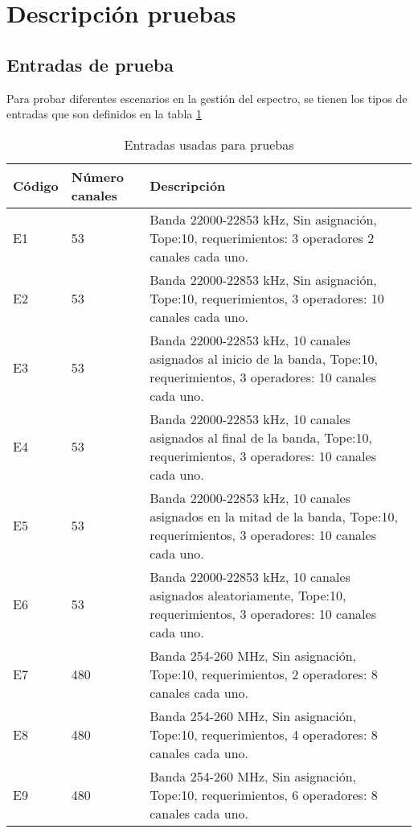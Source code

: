 \section{Descripción pruebas}

\subsection{Entradas de prueba}

Para probar diferentes escenarios en la gestión del espectro, se tienen los tipos de entradas que son definidos en la tabla \ref{tabla:parametrosPruebas}

\begin{center}
\begin{longtable}{|p{2cm}|p{2cm}|p{12.5cm}|}
	\caption{Entradas usadas para pruebas} \label{tabla:parametrosPruebas}\\
	\hline
	\cellcolor[gray]{0.9} \textbf{Código} & \cellcolor[gray]{0.9}\textbf{Número canales} & \cellcolor[gray]{0.9}\textbf{Descripción} \\
	\hline
	E1 & 53 & Banda 22000-22853 kHz, Sin asignación, Tope:10, requerimientos: 3 operadores 2 canales cada uno.\\
	\hline
	E2 & 53 &Banda 22000-22853 kHz,  Sin asignación, Tope:10, requerimientos, 3 operadores: 10 canales cada uno. \\
	\hline
	E3 & 53 &Banda 22000-22853 kHz,  10 canales asignados al inicio de la banda, Tope:10, requerimientos, 3 operadores: 10 canales cada uno. \\
	\hline
	E4 & 53 &Banda 22000-22853 kHz,  10 canales asignados al final de la banda, Tope:10, requerimientos, 3 operadores: 10 canales cada uno. \\
	\hline
	E5 & 53 &Banda 22000-22853 kHz,  10 canales asignados en la mitad de la banda, Tope:10, requerimientos, 3 operadores: 10 canales cada uno. \\
	\hline
	E6 & 53 &Banda 22000-22853 kHz,  10 canales asignados aleatoriamente, Tope:10, requerimientos, 3 operadores: 10 canales cada uno. \\
	\hline
	E7 & 480 &Banda 254-260 MHz,  Sin asignación, Tope:10, requerimientos, 2 operadores: 8 canales cada uno. \\
	\hline
	E8 & 480 &Banda 254-260 MHz,  Sin asignación, Tope:10, requerimientos, 4 operadores: 8 canales cada uno. \\	
	\hline
	E9 & 480 &Banda 254-260 MHz,  Sin asignación, Tope:10, requerimientos, 6 operadores: 8 canales cada uno. \\	

\end{longtable}
\end{center}
